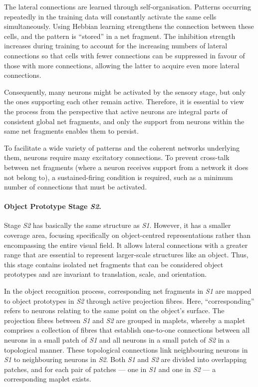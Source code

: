 The lateral connections are learned through self-organisation. Patterns occurring repeatedly in the training data will constantly activate the same cells simultaneously. Using Hebbian learning strengthens the connection between these cells, and the pattern is ``stored'' in a net fragment. The inhibition strength increases during training to account for the increasing numbers of lateral connections so that cells with fewer connections can be suppressed in favour of those with more connections, allowing the latter to acquire even more lateral connections.

Consequently, many neurons might be activated by the sensory stage, but only the ones supporting each other remain active.
Therefore, it is essential to view the process from the perspective that active neurons are integral parts of consistent global net fragments, and only the support from neurons within the same net fragments enables them to persist.

To facilitate a wide variety of patterns and the coherent networks underlying them, neurons require many excitatory connections. To prevent cross-talk between net fragments (where a neuron receives support from a network it does not belong to), a sustained-firing condition is required, such as a minimum number of connections that must be activated.

\paragraph{Object Prototype Stage \emph{S2}.} Stage \emph{S2} has basically the same structure as \emph{S1}. However, it has a smaller coverage area, focusing specifically on object-centred representations rather than encompassing the entire visual field. It allows lateral connections with a greater range that are essential to represent larger-scale structures like an object. 
Thus, this stage contains isolated net fragments that can be considered object prototypes and are invariant to translation, scale, and orientation.

In the object recognition process, corresponding net fragments in \emph{S1} are mapped to object prototypes in \emph{S2} through active projection fibres. Here, ``corresponding'' refers to neurons relating to the same point on the object's surface.
The projection fibres between \emph{S1} and \emph{S2} are grouped in maplets, whereby a maplet comprises a collection of fibres that establish one-to-one connections between all neurons in a small patch of \emph{S1} and all neurons in a small patch of \emph{S2} in a topological manner. These topological connections link neighbouring neurons in \emph{S1} to neighbouring neurons in \emph{S2}. Both \emph{S1} and \emph{S2} are divided into overlapping patches, and for each pair of patches — one in \emph{S1} and one in \emph{S2} — a corresponding maplet exists.

